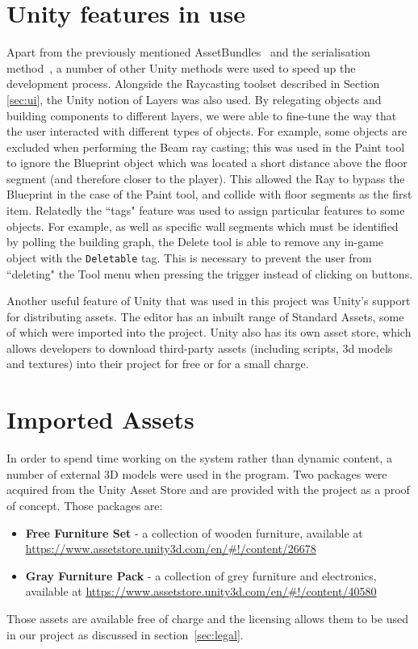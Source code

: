 \section{Unity features in use}
Apart from the previously mentioned AssetBundles~\cite{unity:assetbundle} and the serialisation method~\cite{unity:serialization}, a number of other Unity methods were used to speed up the development process. Alongside the Raycasting toolset described in Section \ref{sec:ui}, the Unity notion of Layers was also used. By relegating objects and building components to different layers, we were able to fine-tune the way that the user interacted with different types of objects. For example, some objects are excluded when performing the Beam ray casting; this was used in the Paint tool to ignore the Blueprint object which was located a short distance above the floor segment (and therefore closer to the player). This allowed the Ray to bypass the Blueprint in the case of the Paint tool, and collide with floor segments as the first item. Relatedly the ``tags" feature was used to assign particular features to some objects. For example, as well as specific wall segments which must be identified by polling the building graph, the Delete tool is able to remove any in-game object with the \verb|Deletable| tag. This is necessary to prevent the user from ``deleting" the Tool menu when pressing the trigger instead of clicking on buttons.

Another useful feature of Unity that was used in this project was Unity's support for distributing assets. The editor has an inbuilt range of Standard Assets, some of which were imported into the project. Unity also has its own asset store, which allows developers to download third-party assets (including scripts, 3d models and textures) into their project for free or for a small charge.


\section{Imported Assets}
In order to spend time working on the system rather than dynamic content, a number of external 3D models were used in the program. Two packages were acquired from the Unity Asset Store and are provided with the project as a proof of concept. Those packages are:
\begin{itemize}
    \item \textbf{Free Furniture Set} - a collection of wooden furniture, available at\\ \url{https://www.assetstore.unity3d.com/en/#!/content/26678}
    \item \textbf{Gray Furniture Pack} - a collection of grey furniture and electronics, available at \url{https://www.assetstore.unity3d.com/en/#!/content/40580} 
\end{itemize}

Those assets are available free of charge and the licensing allows them to be used in our project as discussed in section~\ref{sec:legal}.
